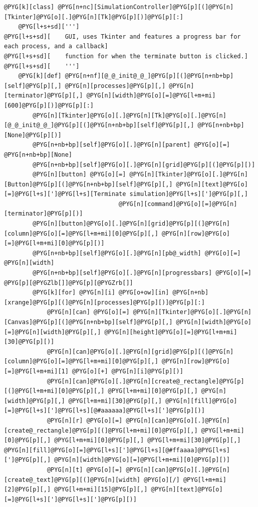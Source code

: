 \documentclass[letterpaper,10pt,english]{manual}
\begin{document}
\begin{Verbatim}[commandchars=@\[\]]
@PYG[k][class] @PYG[n+nc][SimulationController]@PYG[p][(]@PYG[n][Tkinter]@PYG[o][.]@PYG[n][Tk]@PYG[p][)]@PYG[p][:]
    @PYG[l+s+sd][''']
@PYG[l+s+sd][    GUI, uses Tkinter and features a progress bar for each process, and a callback]
@PYG[l+s+sd][    function for when the terminate button is clicked.]
@PYG[l+s+sd][    ''']
    @PYG[k][def] @PYG[n+nf][@_@_init@_@_]@PYG[p][(]@PYG[n+nb+bp][self]@PYG[p][,] @PYG[n][processes]@PYG[p][,] @PYG[n][terminator]@PYG[p][,] @PYG[n][width]@PYG[o][=]@PYG[l+m+mi][600]@PYG[p][)]@PYG[p][:]
        @PYG[n][Tkinter]@PYG[o][.]@PYG[n][Tk]@PYG[o][.]@PYG[n][@_@_init@_@_]@PYG[p][(]@PYG[n+nb+bp][self]@PYG[p][,] @PYG[n+nb+bp][None]@PYG[p][)]
        @PYG[n+nb+bp][self]@PYG[o][.]@PYG[n][parent] @PYG[o][=] @PYG[n+nb+bp][None]
        @PYG[n+nb+bp][self]@PYG[o][.]@PYG[n][grid]@PYG[p][(]@PYG[p][)]
        @PYG[n][button] @PYG[o][=] @PYG[n][Tkinter]@PYG[o][.]@PYG[n][Button]@PYG[p][(]@PYG[n+nb+bp][self]@PYG[p][,] @PYG[n][text]@PYG[o][=]@PYG[l+s][']@PYG[l+s][Terminate simulation]@PYG[l+s][']@PYG[p][,]
                                @PYG[n][command]@PYG[o][=]@PYG[n][terminator]@PYG[p][)]
        @PYG[n][button]@PYG[o][.]@PYG[n][grid]@PYG[p][(]@PYG[n][column]@PYG[o][=]@PYG[l+m+mi][0]@PYG[p][,] @PYG[n][row]@PYG[o][=]@PYG[l+m+mi][0]@PYG[p][)]
        @PYG[n+nb+bp][self]@PYG[o][.]@PYG[n][pb@_width] @PYG[o][=] @PYG[n][width]
        @PYG[n+nb+bp][self]@PYG[o][.]@PYG[n][progressbars] @PYG[o][=] @PYG[p][@PYGZlb[]]@PYG[p][@PYGZrb[]]
        @PYG[k][for] @PYG[n][i] @PYG[o+ow][in] @PYG[n+nb][xrange]@PYG[p][(]@PYG[n][processes]@PYG[p][)]@PYG[p][:]
            @PYG[n][can] @PYG[o][=] @PYG[n][Tkinter]@PYG[o][.]@PYG[n][Canvas]@PYG[p][(]@PYG[n+nb+bp][self]@PYG[p][,] @PYG[n][width]@PYG[o][=]@PYG[n][width]@PYG[p][,] @PYG[n][height]@PYG[o][=]@PYG[l+m+mi][30]@PYG[p][)]
            @PYG[n][can]@PYG[o][.]@PYG[n][grid]@PYG[p][(]@PYG[n][column]@PYG[o][=]@PYG[l+m+mi][0]@PYG[p][,] @PYG[n][row]@PYG[o][=]@PYG[l+m+mi][1] @PYG[o][+] @PYG[n][i]@PYG[p][)]
            @PYG[n][can]@PYG[o][.]@PYG[n][create@_rectangle]@PYG[p][(]@PYG[l+m+mi][0]@PYG[p][,] @PYG[l+m+mi][0]@PYG[p][,] @PYG[n][width]@PYG[p][,] @PYG[l+m+mi][30]@PYG[p][,] @PYG[n][fill]@PYG[o][=]@PYG[l+s][']@PYG[l+s][@#aaaaaa]@PYG[l+s][']@PYG[p][)]
            @PYG[n][r] @PYG[o][=] @PYG[n][can]@PYG[o][.]@PYG[n][create@_rectangle]@PYG[p][(]@PYG[l+m+mi][0]@PYG[p][,] @PYG[l+m+mi][0]@PYG[p][,] @PYG[l+m+mi][0]@PYG[p][,] @PYG[l+m+mi][30]@PYG[p][,] @PYG[n][fill]@PYG[o][=]@PYG[l+s][']@PYG[l+s][@#ffaaaa]@PYG[l+s][']@PYG[p][,] @PYG[n][width]@PYG[o][=]@PYG[l+m+mi][0]@PYG[p][)]
            @PYG[n][t] @PYG[o][=] @PYG[n][can]@PYG[o][.]@PYG[n][create@_text]@PYG[p][(]@PYG[n][width] @PYG[o][/] @PYG[l+m+mi][2]@PYG[p][,] @PYG[l+m+mi][15]@PYG[p][,] @PYG[n][text]@PYG[o][=]@PYG[l+s][']@PYG[l+s][']@PYG[p][)]

\end{Verbatim}
\end{document}
